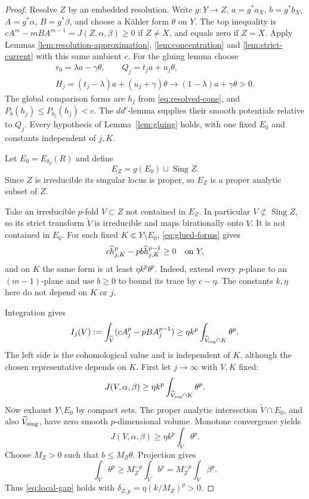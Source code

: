 \documentclass[reqno]{amsart}
\theoremstyle{remark}
\theoremstyle{plain}
\begin{document}
\begin{proof}
Resolve \(Z\) by an embedded resolution. Write \(g:Y\to Z\), \(a=g^*a_X\), \(b=g^*b_X\), \(A=g^*\alpha\), \(B=g^*\beta\), and choose a K\"ahler form \(\theta\) on \(Y\). The top inequality is \(cA^m-mBA^{m-1}=J(Z,\alpha,\beta)\ge0\) if \(Z\ne X\), and equals zero if \(Z=X\). Apply Lemmas \ref{lem:resolution-approximation}, \ref{lem:concentration} and \ref{lem:strict-current} with this same ambient \(c\). For the gluing lemma choose
\[
\begin{gathered}
r_0=\lambda a-\gamma\theta,\qquad Q_j=t_ja+u_j\theta,\\
H_j=(t_j-\lambda)a+(u_j+\gamma)\theta
\longrightarrow(1-\lambda)a+\gamma\theta>0.
\end{gathered}
\]
The global comparison forms are \(h_j\) from \eqref{eq:resolved-cone}, and \(P_b(h_j)\le P_{b_j}(h_j)<c\). The \(dd^c\)-lemma supplies their smooth potentials relative to \(Q_j\). Every hypothesis of Lemma~\ref{lem:gluing} holds, with one fixed \(E_0\) and constants independent of \(j,K\).

Let \(E_0=E_{\delta_0}(R)\) and define
\[
E_Z=g(E_0)\cup\operatorname{Sing}Z.
\]
 Since \(Z\) is irreducible its singular locus is proper, so \(E_Z\) is a proper analytic subset of $Z$.

Take an irreducible \(p\)-fold \(V\subset Z\) not contained in \(E_Z\). In particular \(V\not\subset\operatorname{Sing}Z\), so its strict transform \(\widetilde V\) is irreducible and maps birationally onto \(V\). It is not contained in \(E_0\). For each fixed \(K\Subset Y\setminus E_0\), \eqref{eq:glued-forms} gives
\[
c\widehat h_{j,K}^p-pb\widehat h_{j,K}^{p-1}\ge0
\quad\hbox{on }Y,
\]
and on \(K\) the same form is at least \(\eta k^p\theta^p\). Indeed, extend every \(p\)-plane to an \((m-1)\)-plane and use \(b\ge0\) to bound its trace by \(c-\eta\). The constants \(k,\eta\) here do not depend on \(K\) or \(j\).

Integration gives
\[
I_j(V):=\int_{\widetilde V}(cA_j^p-pBA_j^{p-1})
\ge\eta k^p\int_{\widetilde V_{\rm reg}\cap K}\theta^p.
\]
The left side is the cohomological value and is independent of \(K\), although the chosen representative depends on \(K\). First let \(j\to\infty\) with \(V,K\) fixed:
\[
J(V,\alpha,\beta)\ge\eta k^p\int_{\widetilde V_{\rm reg}\cap K}\theta^p.
\]
Now exhaust \(Y\setminus E_0\) by compact sets. The proper analytic intersection \(\widetilde V\cap E_0\), and also \(\widetilde V_{\rm sing}\), have zero smooth \(p\)-dimensional volume. Monotone convergence yields
\[
J(V,\alpha,\beta)\ge\eta k^p\int_{\widetilde V}\theta^p.
\]
Choose \(M_Z>0\) such that \(b\le M_Z\theta\). Projection gives
\[
\int_{\widetilde V}\theta^p
\ge M_Z^{-p}\int_{\widetilde V}b^p
=M_Z^{-p}\int_V\beta^p.
\]
Thus \eqref{eq:local-gap} holds with \(\delta_{Z,p}=\eta(k/M_Z)^p>0\).


\end{proof}
\end{document}
